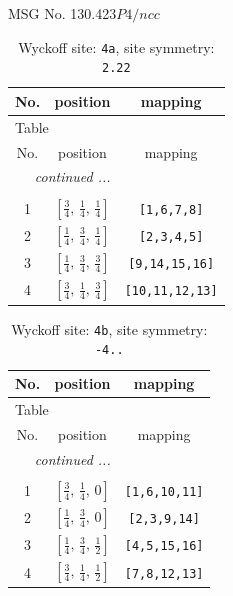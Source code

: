 \documentclass[fleqn,8pt]{jsarticle}
\begin{document}
\setcounter{MaxMatrixCols}{32}

\renewcommand{\tablename}{Table~}
\renewcommand{\figurename}{Figure~}
\begin{center}
\LARGE
MSG No. 130.423\quad$P4/ncc$
\end{center}
\renewcommand{\arraystretch}{1.2}
\begin{longtable}{ccc}
\caption{Wyckoff site: {\tt 4a}, site symmetry: {\tt 2.22}}
 \\
 \hline \hline
No. & position & mapping \\ \hline \endfirsthead

\multicolumn{2}{l}{\tablename\ \thetable{}} \\
 \hline \hline
No. & position & mapping \\ \hline \endhead

 \hline \hline
\multicolumn{2}{r}{\footnotesize\it continued ...} \\ \endfoot

 \hline \hline
\multicolumn{2}{r}{} \\ \endlastfoot

1 & $\left[ \frac{3}{4},\, \frac{1}{4},\, \frac{1}{4} \right]$ & {\tt [1,6,7,8]} \\ \hline
2 & $\left[ \frac{1}{4},\, \frac{3}{4},\, \frac{1}{4} \right]$ & {\tt [2,3,4,5]} \\ \hline
3 & $\left[ \frac{1}{4},\, \frac{3}{4},\, \frac{3}{4} \right]$ & {\tt [9,14,15,16]} \\ \hline
4 & $\left[ \frac{3}{4},\, \frac{1}{4},\, \frac{3}{4} \right]$ & {\tt [10,11,12,13]} \\
\end{longtable}
\renewcommand{\arraystretch}{1.2}
\begin{longtable}{ccc}
\caption{Wyckoff site: {\tt 4b}, site symmetry: {\tt -4..}}
 \\
 \hline \hline
No. & position & mapping \\ \hline \endfirsthead

\multicolumn{2}{l}{\tablename\ \thetable{}} \\
 \hline \hline
No. & position & mapping \\ \hline \endhead

 \hline \hline
\multicolumn{2}{r}{\footnotesize\it continued ...} \\ \endfoot

 \hline \hline
\multicolumn{2}{r}{} \\ \endlastfoot

1 & $\left[ \frac{3}{4},\, \frac{1}{4},\, 0 \right]$ & {\tt [1,6,10,11]} \\ \hline
2 & $\left[ \frac{1}{4},\, \frac{3}{4},\, 0 \right]$ & {\tt [2,3,9,14]} \\ \hline
3 & $\left[ \frac{1}{4},\, \frac{3}{4},\, \frac{1}{2} \right]$ & {\tt [4,5,15,16]} \\ \hline
4 & $\left[ \frac{3}{4},\, \frac{1}{4},\, \frac{1}{2} \right]$ & {\tt [7,8,12,13]} \\
\end{longtable}
\end{document}
